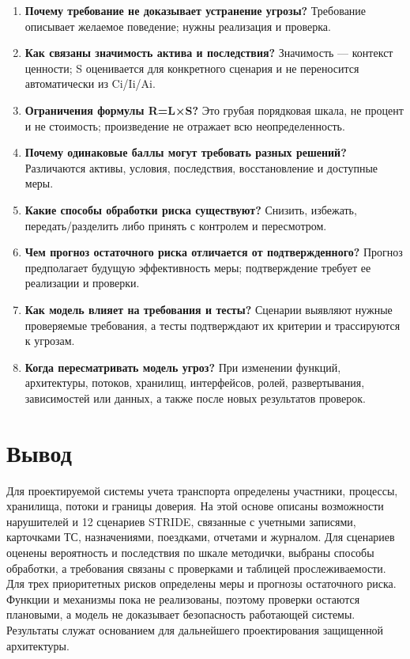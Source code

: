 \documentclass[12pt,a4paper]{article}
\begin{document}
\begin{enumerate}[leftmargin=1.0cm]
\item \textbf{Почему требование не доказывает устранение угрозы?} Требование описывает желаемое поведение; нужны реализация и проверка.
\item \textbf{Как связаны значимость актива и последствия?} Значимость — контекст ценности; S оценивается для конкретного сценария и не переносится автоматически из Ci/Ii/Ai.
\item \textbf{Ограничения формулы R=L×S?} Это грубая порядковая шкала, не процент и не стоимость; произведение не отражает всю неопределенность.
\item \textbf{Почему одинаковые баллы могут требовать разных решений?} Различаются активы, условия, последствия, восстановление и доступные меры.
\item \textbf{Какие способы обработки риска существуют?} Снизить, избежать, передать/разделить либо принять с контролем и пересмотром.
\item \textbf{Чем прогноз остаточного риска отличается от подтвержденного?} Прогноз предполагает будущую эффективность меры; подтверждение требует ее реализации и проверки.
\item \textbf{Как модель влияет на требования и тесты?} Сценарии выявляют нужные проверяемые требования, а тесты подтверждают их критерии и трассируются к угрозам.
\item \textbf{Когда пересматривать модель угроз?} При изменении функций, архитектуры, потоков, хранилищ, интерфейсов, ролей, развертывания, зависимостей или данных, а также после новых результатов проверок.
\end{enumerate}

\section{Вывод}
Для проектируемой системы учета транспорта определены участники, процессы, хранилища, потоки и границы доверия. На этой основе описаны возможности нарушителей и 12 сценариев STRIDE, связанные с учетными записями, карточками ТС, назначениями, поездками, отчетами и журналом. Для сценариев оценены вероятность и последствия по шкале методички, выбраны способы обработки, а требования связаны с проверками и таблицей прослеживаемости. Для трех приоритетных рисков определены меры и прогнозы остаточного риска. Функции и механизмы пока не реализованы, поэтому проверки остаются плановыми, а модель не доказывает безопасность работающей системы. Результаты служат основанием для дальнейшего проектирования защищенной архитектуры.
\end{document}
